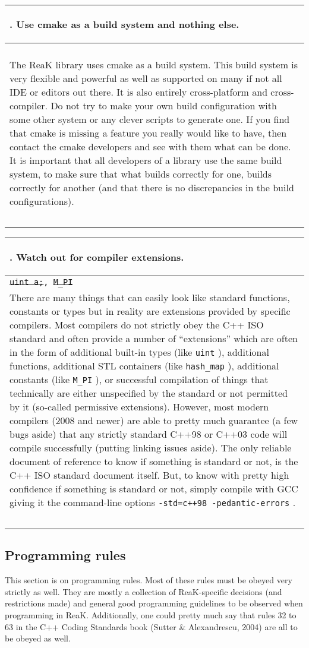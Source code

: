 \documentclass[10pt]{article}
\newcommand{\code}[1]{\color[rgb]{0.2,0.8,0.2}\texttt{#1}\color[rgb]{0,0,0} }
\newcounter {iCommandment}
\newcommand{\CorG}[5]
{
\begin{table}[H]
\begin{center}
\begin{tabular}{| p{12cm} |}
\hline
#1. #2 \\
\hline
\vspace{-0.1cm}
\parbox{12cm}{\code{#3}} \\
\vspace{-0.2cm}
#4 \\
#5 \\
\hline
\end{tabular}
\end{center}
\end{table}
}
\newcommand{\Commandment}[4]
{
\CorG{\textbf{\arabic{iCommandment}}\addtocounter{iCommandment}{1}}
{\textbf{#1}}{#2}{#3}{#4}
}
\begin{document}
\Commandment
{Use cmake as a build system and nothing else.}
{\ }
{The ReaK library uses cmake as a build system. This build system is very flexible and powerful as well as supported on
many if not all IDE or editors out there. It is also entirely cross-platform and cross-compiler. Do not try to make your 
own build configuration with some other system or any clever scripts to generate one. If you find that cmake is missing
a feature you really would like to have, then contact the cmake developers and see with them what can be done. It is 
important that all developers of a library use the same build system, to make sure that what builds correctly for one, 
builds correctly for another (and that there is no discrepancies in the build configurations).}
{\ }

\Commandment
{Watch out for compiler extensions.}
{\sout{uint a;}, \sout{M\_PI} }
{There are many things that can easily look like standard functions, constants or types but in reality are extensions
provided by specific compilers. Most compilers do not strictly obey the C++ ISO standard and often provide a number of ``extensions''
which are often in the form of additional built-in types (like \code{uint}), additional functions, additional STL 
containers (like \code{hash\_map}), additional constants (like \code{M\_PI}), or successful compilation of things that 
technically are either unspecified by the standard or not permitted by it (so-called permissive extensions). However, most 
modern compilers (2008 and newer) are able to pretty much guarantee (a few bugs aside) that any strictly standard C++98 or 
C++03 code will compile successfully (putting linking issues aside). The only reliable document of reference to know if 
something is standard or not, is the C++ ISO standard document itself. But, to know with pretty high confidence if something 
is standard or not, simply compile with GCC giving it the command-line options \code{-std=c++98 -pedantic-errors}.}
{\ }


\subsection{Programming rules}

This section is on programming rules. Most of these rules must be obeyed very strictly as well. They are 
mostly a collection of ReaK-specific decisions (and restrictions made) and general good programming guidelines 
to be observed when programming in ReaK. Additionally, one could pretty much say that rules 32 to 63 in the 
C++ Coding Standards book (Sutter \& Alexandrescu, 2004) are all to be obeyed as well.
\end{document}
